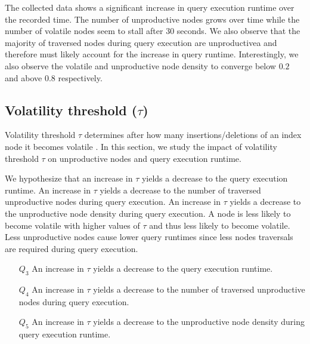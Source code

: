 \documentclass[abstracton,12pt]{scrartcl}
\theoremstyle{definition}
\begin{document}
The collected data shows a significant increase in query execution runtime over the
recorded time. The number of unproductive nodes grows over time while the number
of volatile nodes seem to stall after 30 seconds. We also observe that the
majority of traversed nodes during query execution are unproductivea and
therefore must likely account for the increase in query runtime. Interestingly,
we also observe the volatile and unproductive node density to converge below
$0.2$ and above $0.8$ respectively.

\subsection{Volatility threshold ($\tau$)}

Volatility threshold $\tau$ determines after how many insertions/deletions of an index node
it becomes volatile \cite{KW17}. In this section, we study the impact of
volatility threshold $\tau$ on unproductive nodes and query execution runtime.

We hypothesize that an increase in $\tau$ yields a decrease to the query
execution runtime.
An increase in $\tau$ yields a decrease to the number of traversed unproductive
nodes during query execution.
An increase in $\tau$ yields a decrease to the unproductive node density during
query execution.
A node is less likely to become volatile with higher values
of $\tau$ and thus less likely to become volatile. 
Less unproductive nodes cause lower query  runtimes since less nodes traversals
are required during query execution.

\begin{framed}
  \begin{itemize}
  \item[$Q_3$] An increase in $\tau$ yields a decrease to the query execution runtime. 
  \item[$Q_4$] An increase in $\tau$ yields a decrease to the number of
    traversed unproductive nodes during query execution.
  \item[$Q_5$] An increase in $\tau$ yields a decrease to the unproductive node
    density during query execution 
    runtime.
  \end{itemize}
\end{framed}
\end{document}
